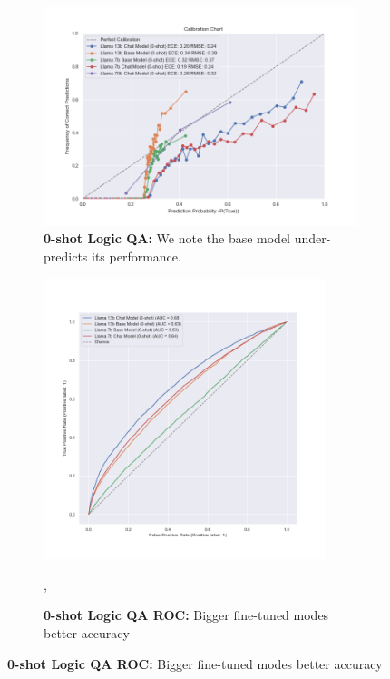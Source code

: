 \documentclass[11pt]{article}
\begin{document}
\begin{figure}
     \centering
     \begin{subfigure}[b]{0.60\textwidth}
         \centering \includegraphics[width=1.0\textwidth]{figures/0-shot-logic-qa.png}
         \caption{\textbf{0-shot Logic QA:} We note the base model under-predicts its performance.} 
         \label{fig:0-shot-logic-qa}
     \end{subfigure}
     \hfill
     \begin{subfigure}[b]{0.38\textwidth}
         \centering \includegraphics[width=0.9\textwidth]{figures/0-shot-logic-qa-roc.png}
         \caption{\textbf{0-shot Logic QA ROC:} Bigger fine-tuned modes better accuracy},
         \label{fig:0-shot-logic-qa-roc}
    \end{subfigure}  
    

\end{figure}
\end{document}
